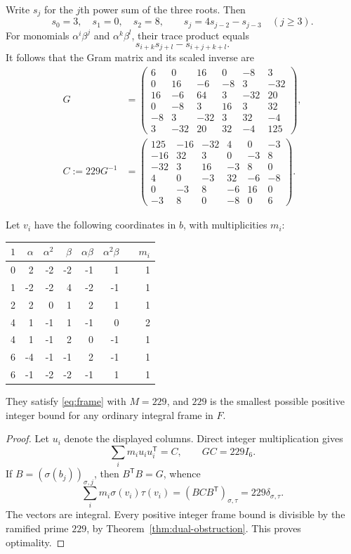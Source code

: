 Write $s_j$ for the $j$th power sum of the three roots. Then
\[
 s_0=3,\quad s_1=0,\quad s_2=8,\qquad
 s_j=4s_{j-2}-s_{j-3}\quad(j\ge3).
\]
For monomials $\alpha^i\beta^j$ and $\alpha^k\beta^l$, their trace product equals
\[
 s_{i+k}s_{j+l}-s_{i+j+k+l}.
\]
It follows that the Gram matrix and its scaled inverse are
\begin{align*}
G&=\begin{pmatrix}
6&0&16&0&-8&3\\
0&16&-6&-8&3&-32\\
16&-6&64&3&-32&20\\
0&-8&3&16&3&32\\
-8&3&-32&3&32&-4\\
3&-32&20&32&-4&125
\end{pmatrix},\\[3pt]
C:=229G^{-1}&=\begin{pmatrix}
125&-16&-32&4&0&-3\\
-16&32&3&0&-3&8\\
-32&3&16&-3&8&0\\
4&0&-3&32&-6&-8\\
0&-3&8&-6&16&0\\
-3&8&0&-8&0&6
\end{pmatrix}.
\end{align*}

\begin{theorem}\label{thm:optimal229}
Let $v_i$ have the following coordinates in $b$, with multiplicities $m_i$:
\begin{center}
\begin{tabular}{@{}rrrrrrcr@{}}
\toprule
$1$&$\alpha$&$\alpha^2$&$\beta$&$\alpha\beta$&$\alpha^2\beta$&&$m_i$\\\midrule
0&2&-2&-2&-1&1&&1\\
1&-2&-2&4&-2&-1&&1\\
2&2&0&1&2&1&&1\\
4&1&-1&1&-1&0&&2\\
4&1&-1&2&0&-1&&1\\
6&-4&-1&-1&2&-1&&1\\
6&-1&-2&-2&-1&1&&1\\\bottomrule
\end{tabular}
\end{center}
They satisfy \eqref{eq:frame} with $M=229$, and $229$ is the smallest possible positive integer bound for any ordinary integral frame in $F$.
\end{theorem}

\begin{proof}
Let $u_i$ denote the displayed columns. Direct integer multiplication gives
\[
 \sum_i m_i u_i u_i^{\mathsf T}=C,
 \qquad GC=229I_6.
\]
If $B=(\sigma(b_j))_{\sigma,j}$, then $B^{\mathsf T}B=G$, whence
\[
 \sum_i m_i\sigma(v_i)\tau(v_i)
 =(BCB^{\mathsf T})_{\sigma,\tau}=229\delta_{\sigma,\tau}.
\]
The vectors are integral. Every positive integer frame bound is divisible by the ramified prime $229$, by Theorem~\ref{thm:dual-obstruction}. This proves optimality.
\end{proof}

